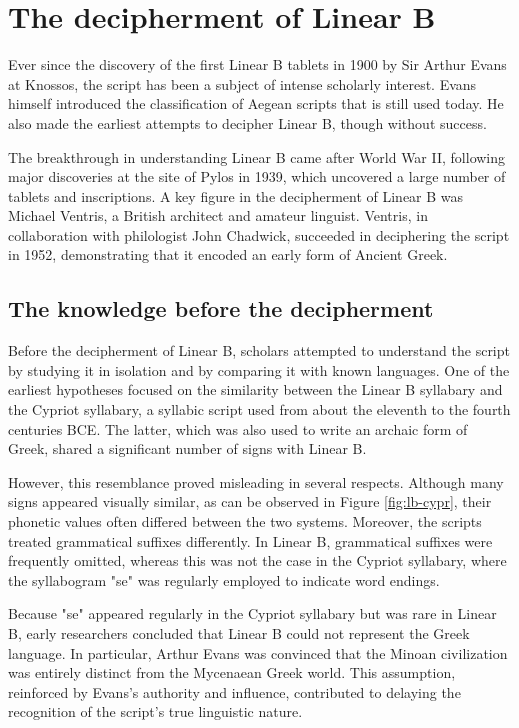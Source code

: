 \section{The decipherment of Linear B} \label{sec:decipherment}
Ever since the discovery of the first Linear B tablets in 1900 by Sir Arthur Evans at Knossos, the script has been a subject of intense scholarly interest.
Evans himself introduced the classification of Aegean scripts that is still used today.
He also made the earliest attempts to decipher Linear B, though without success.

The breakthrough in understanding Linear B came after World War II, following major discoveries at the site of Pylos in 1939, which uncovered a large number of tablets and inscriptions.
A key figure in the decipherment of Linear B was Michael Ventris, a British architect and amateur linguist.
Ventris, in collaboration with philologist John Chadwick, succeeded in deciphering the script in 1952, demonstrating that it encoded an early form of Ancient Greek.

\subsection{The knowledge before the decipherment}

Before the decipherment of Linear B, scholars attempted to understand the script by studying it in isolation and by comparing it with known languages.  
One of the earliest hypotheses focused on the similarity between the Linear B syllabary and the Cypriot syllabary, a syllabic script used from about the eleventh to the fourth centuries BCE.  
The latter, which was also used to write an archaic form of Greek, shared a significant number of signs with Linear B.

However, this resemblance proved misleading in several respects.  
Although many signs appeared visually similar, as can be observed in Figure \ref{fig:lb-cypr}, their phonetic values often differed between the two systems.  
Moreover, the scripts treated grammatical suffixes differently.  
In Linear B, grammatical suffixes were frequently omitted, whereas this was not the case in the Cypriot syllabary, where the syllabogram "se" was regularly employed to indicate word endings.

Because "se" appeared regularly in the Cypriot syllabary but was rare in Linear B, early researchers concluded that Linear B could not represent the Greek language.  
In particular, Arthur Evans was convinced that the Minoan civilization was entirely distinct from the Mycenaean Greek world.  
This assumption, reinforced by Evans's authority and influence, contributed to delaying the recognition of the script's true linguistic nature. \cite{chad-ch2}

